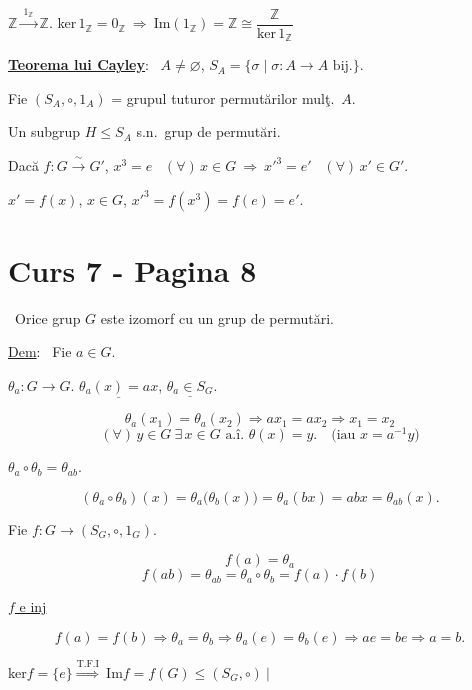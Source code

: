 \bigskip
\noindent $\mathbb{Z} \xrightarrow{\ 1_{\mathbb{Z}}\ } \mathbb{Z}$. \quad ker$\,1_\mathbb{Z} = 0_\mathbb{Z} \ \Rightarrow \ \text{Im}(1_\mathbb{Z}) = \mathbb{Z} \cong \dfrac{\mathbb{Z}}{\text{ker}\,1_\mathbb{Z}}$

\bigskip
\noindent\underline{\textbf{Teorema lui Cayley}}: \ $A\neq\varnothing$, $S_A = \{\sigma \mid \sigma:A\to A \text{ bij.}\}$.

\bigskip
\noindent Fie $(S_A,\circ,1_A)$ = grupul tuturor permutărilor mulţ.\ $A$.

\noindent Un subgrup $H\leq S_A$ s.n.\ grup de permutări.

\bigskip
\noindent Dacă $f:G\xrightarrow{\ \sim\ }G'$, \quad $x^3=e$ \ $(\forall)\,x\in G \ \Rightarrow \ x'^3=e'$ \ $(\forall)\,x'\in G'$.

\noindent $x'=f(x)$, $x\in G$, \quad $x'^3 = f(x^3) = f(e) = e'$.




\section*{Curs 7 - Pagina 8}

\noindent{} \ Orice grup $G$ este izomorf cu un grup de permutări.

\bigskip
\noindent\underline{Dem}: \ Fie $a\in G$.

\noindent $\theta_a: G\to G$. \quad $\underline{\theta_a(x)=ax}$, \quad $\underline{\theta_a\in S_G}$.

\[
\theta_a(x_1)=\theta_a(x_2) \Rightarrow ax_1=ax_2 \Rightarrow x_1=x_2
\]
\[
(\forall)\,y\in G \ \exists\,x\in G \text{ a.î. } \theta(x)=y. \quad \text{(iau } x=a^{-1}y\text{)}
\]

\bigskip
\noindent\underline{$\theta_a\circ\theta_b = \theta_{ab}$}.

\[
(\theta_a\circ\theta_b)(x) = \theta_a\big(\theta_b(x)\big) = \theta_a(bx) = abx = \theta_{ab}(x).
\]

\bigskip
\noindent Fie $f: G \to (S_G,\circ,1_G)$.

\[
f(a) = \theta_a
\]
\[
f(ab) = \theta_{ab} = \theta_a\circ\theta_b = f(a)\cdot f(b)
\]

\bigskip
\noindent\underline{$f$ e inj}

\[
f(a)=f(b) \Rightarrow \theta_a=\theta_b \Rightarrow \theta_a(e)=\theta_b(e) \Rightarrow ae=be \Rightarrow a=b.
\]

\bigskip
\noindent ker$f=\{e\} \overset{\text{T.F.I}}{\Longrightarrow} \ \text{Im}f = f(G) \leq (S_G,\circ) \ \Big|$

